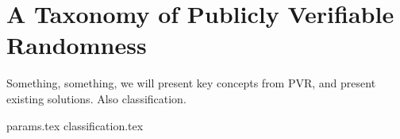 \section{A Taxonomy of Publicly Verifiable Randomness}
\label{sec:a_taxonomy_of_publicly_verifiable_randomness}
Something, something, we will present key concepts from PVR, and present existing solutions.
Also classification.

{params.tex}
{classification.tex}

